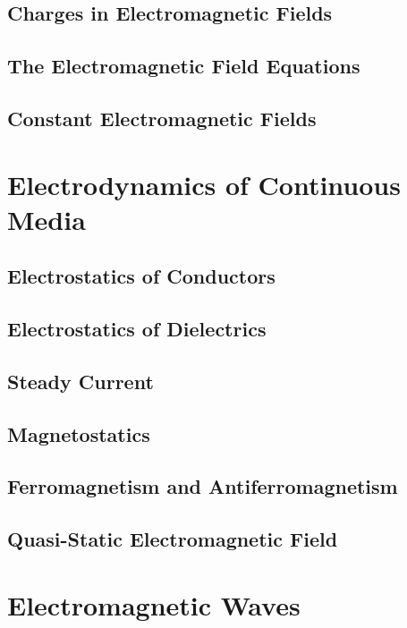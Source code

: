\documentclass[
    ebook,
    11pt,
    oneside,
    onecolumn,
    openright,
    final
]{memoir}
\begin{document}
\chapter[Charges in EM Fields]{Charges in Electromagnetic Fields}



\chapter[The EM Field Equations]{The Electromagnetic Field Equations}

\chapter[Constant EM Fields]{Constant Electromagnetic Fields}

\part{Electrodynamics of Continuous Media}

\chapter{Electrostatics of Conductors}

\chapter{Electrostatics of Dielectrics}

\chapter{Steady Current}

\chapter{Magnetostatics}

\chapter{Ferromagnetism and Antiferromagnetism}

\chapter{Quasi-Static Electromagnetic Field}

\part{Electromagnetic Waves}
\end{document}
